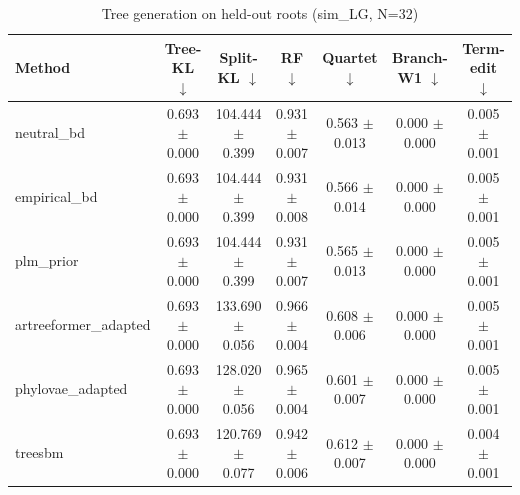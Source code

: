 \begin{table}[t]\centering
\caption{Tree generation on held-out roots (sim_LG, N=32)}
\begin{tabular}{lcccccc}
\toprule
Method & Tree-KL $\downarrow$ & Split-KL $\downarrow$ & RF $\downarrow$ & Quartet $\downarrow$ & Branch-W1 $\downarrow$ & Term-edit $\downarrow$ \\
\midrule
neutral\_bd & 0.693 $\pm$ 0.000 & 104.444 $\pm$ 0.399 & 0.931 $\pm$ 0.007 & 0.563 $\pm$ 0.013 & 0.000 $\pm$ 0.000 & 0.005 $\pm$ 0.001 \\
empirical\_bd & 0.693 $\pm$ 0.000 & 104.444 $\pm$ 0.399 & 0.931 $\pm$ 0.008 & 0.566 $\pm$ 0.014 & 0.000 $\pm$ 0.000 & 0.005 $\pm$ 0.001 \\
plm\_prior & 0.693 $\pm$ 0.000 & 104.444 $\pm$ 0.399 & 0.931 $\pm$ 0.007 & 0.565 $\pm$ 0.013 & 0.000 $\pm$ 0.000 & 0.005 $\pm$ 0.001 \\
artreeformer\_adapted & 0.693 $\pm$ 0.000 & 133.690 $\pm$ 0.056 & 0.966 $\pm$ 0.004 & 0.608 $\pm$ 0.006 & 0.000 $\pm$ 0.000 & 0.005 $\pm$ 0.001 \\
phylovae\_adapted & 0.693 $\pm$ 0.000 & 128.020 $\pm$ 0.056 & 0.965 $\pm$ 0.004 & 0.601 $\pm$ 0.007 & 0.000 $\pm$ 0.000 & 0.005 $\pm$ 0.001 \\
treesbm & 0.693 $\pm$ 0.000 & 120.769 $\pm$ 0.077 & 0.942 $\pm$ 0.006 & 0.612 $\pm$ 0.007 & 0.000 $\pm$ 0.000 & 0.004 $\pm$ 0.001 \\
\bottomrule
\end{tabular}
\end{table}